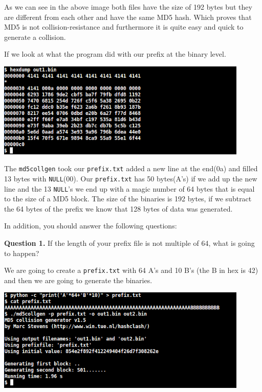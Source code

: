 \documentclass[a4paper]{article}
\begin{document}
\bigskip

As we can see in the above image both files have the size of 192 bytes but they are different from each other and have the same MD5 hash. Which proves that MD5 is not collision-resistance and furthermore it is quite easy and quick to generate a collision.

If we look at what the program did with our prefix at the binary level.

\bigskip

\includegraphics[width=0.9\textwidth]{bash/md5collgenoutdump.png}

\bigskip

The \texttt{md5collgen} took our \texttt{prefix.txt} added a new line at the end(0a) and filled 13 bytes with \texttt{NULL}(00). Our \texttt{prefix.txt} has 50 bytes(A's) if we add up the new line and the 13 \texttt{NULL}'s we end up with a magic number of 64 bytes that is equal to the size of a MD5 block. The size of the binaries is 192 bytes, if we subtract the 64 bytes of the prefix we know that 128 bytes of data was generated.

\bigskip

In addition, you should answer the following questions:

\textbf{Question 1.} If the length of your prefix file is not multiple of 64, what is going to happen?

\bigskip

We are going to create a \texttt{prefix.txt} with 64 A's and 10 B's (the B in hex is 42) and then we are going to generate the binaries.

\bigskip

\includegraphics[width=0.9\textwidth]{bash/md5collgenoutAB.png}
\end{document}
